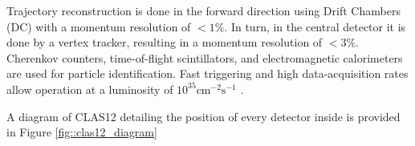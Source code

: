     Trajectory reconstruction is done in the forward direction using Drift Chambers (DC) with a momentum resolution of $< 1\%$.
    In turn, in the central detector it is done by a vertex tracker, resulting in a momentum resolution of $< 3\%$.
    Cherenkov counters, time-of-flight scintillators, and electromagnetic calorimeters are used for particle identification.
    Fast triggering and high data-acquisition rates allow operation at a luminosity of $10^{35} \text{cm}^{-2}\text{s}^{-1}$ \cite{burkert2020}.
    
    A diagram of CLAS12 detailing the position of every detector inside is provided in Figure \ref{fig::clas12_diagram}

    
    
    
